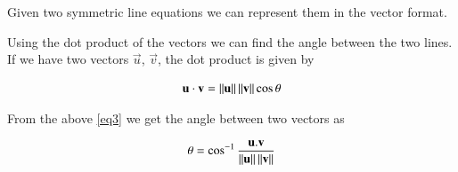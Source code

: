 \documentclass[journal,12pt,twocolumn]{IEEEtran}
\begin{document}
	Given two symmetric line equations we can represent them in the vector format.
	
	Using the dot product of the vectors we can find the angle between the two lines. If we have two vectors $\vec{u}$, $\vec{v}$, the dot product is given by 
	
	\begin{equation}\label{eq3}
	\mathbf{u} \cdot \mathbf{v} = \left\lVert\mathbf{u}\right\rVert \left\lVert\mathbf{v}\right\rVert \cos \theta
	\end{equation}
	
	From the above \ref{eq3} we get the angle between two vectors as
	
	\begin{equation}\label{eq4}
		\theta = \cos ^{-1}\frac{\mathbf{u}.\mathbf{v}}{\left\lVert\mathbf{u}\right\rVert \left\lVert\mathbf{v}\right\rVert}
	\end{equation}
	
	
\end{document}
